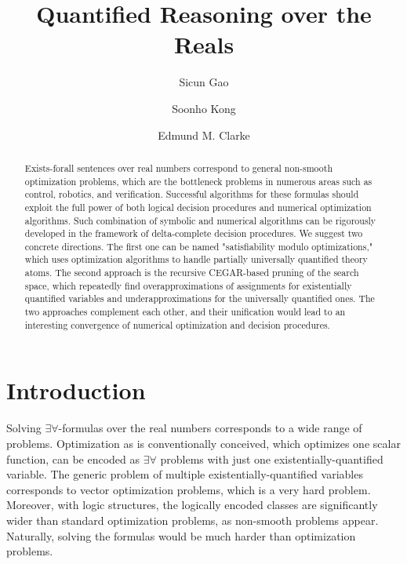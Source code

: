 \documentclass{llncs}
\title{Quantified Reasoning over the Reals}
\author{Sicun Gao \and Soonho Kong \and Edmund M. Clarke}
\institute{Carnegie Mellon University, Pittsburgh, PA, USA 15213}
\begin{document}
\maketitle

\begin{abstract}
Exists-forall sentences over real numbers correspond to general non-smooth optimization problems, which are the bottleneck problems in numerous areas such as control, robotics, and
verification. Successful algorithms for these formulas should exploit
the full power of both logical decision procedures and numerical
optimization algorithms. Such combination of symbolic and numerical
algorithms can be rigorously developed in the framework of
delta-complete decision procedures. We suggest two concrete
directions. The first one can be named "satisfiability modulo
optimizations," which uses optimization algorithms to handle partially
universally quantified theory atoms. The second approach is the
recursive CEGAR-based pruning of the search space, which repeatedly
find overapproximations of assignments for existentially quantified
variables and underapproximations for the universally quantified ones.
The two approaches complement each other, and their unification would
lead to an interesting convergence of numerical optimization and
decision procedures.
\end{abstract}

\section{Introduction}

Solving $\exists\forall$-formulas over the real numbers corresponds to a wide range of problems. Optimization as is conventionally conceived, which optimizes one scalar function, can be encoded as $\exists\forall$ problems with just one existentially-quantified variable. The generic problem of multiple existentially-quantified variables corresponds to vector optimization problems, which is a very hard problem. Moreover, with logic structures, the logically encoded classes are significantly wider than standard optimization problems, as non-smooth problems appear. Naturally, solving the formulas would be much harder than optimization problems. 
\end{document}
